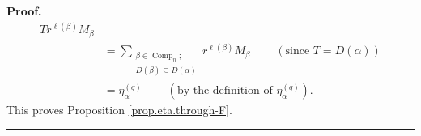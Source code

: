 \documentclass[numbers=enddot,12pt,final,onecolumn,notitlepage]{scrartcl}%
\theoremstyle{definition}
\newenvironment{proof}[1][Proof]{\noindent\textbf{#1.} }{\ \rule{0.5em}{0.5em}}
\let\sumnonlimits\sum
\renewcommand{\sum}{\sumnonlimits\limits}
\newenvironment{verlong}{}{}
\newenvironment{vershort}{}{}
\begin{document}
\begin{vershort}
\begin{proof}
\begin{align*}
{{T}}r^{\ell\left(  \beta\right)  }M_{\beta}\\
&  =\sum_{\substack{\beta\in\operatorname*{Comp}\nolimits_{n};\\D\left(
\beta\right)  \subseteq D\left(  \alpha\right)  }}r^{\ell\left(  \beta\right)
}M_{\beta}\ \ \ \ \ \ \ \ \ \ \left(  \text{since }T=D\left(  \alpha\right)
\right) \\
&  =\eta_{\alpha}^{\left(  q\right)  }\ \ \ \ \ \ \ \ \ \ \left(  \text{by the
definition of }\eta_{\alpha}^{\left(  q\right)  }\right)  .
\end{align*}
This proves Proposition \ref{prop.eta.through-F}.
\end{proof}
\end{vershort}

\begin{verlong}



\end{verlong}
\end{document}
